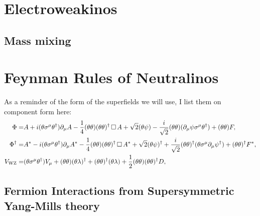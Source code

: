 \documentclass[../main.tex]{subfiles}
\begin{document}
\begin{donotread}
  \section{Electroweakinos}
  \subsection{Mass mixing}

  \section{Feynman Rules of Neutralinos}

  \begin{temporary}
    As a reminder of the form of the superfields we will use, I list them on component form here:
    \begin{subequations}
      \begin{align}
        \Phi =         & A + i(\theta\sigma^\mu\theta^\dagger) \partial_\mu A - \frac{1}{4} (\theta\theta)(\theta\theta)^\dagger \operatorname{\Box} A +
        \sqrt{2} (\theta\psi) - \frac{i}{\sqrt{2}} (\theta\theta) (\partial_\mu \psi \sigma^\mu \theta^\dagger) + (\theta\theta) F,                     \\
        \Phi^\dag =    & A^\ast - i(\theta\sigma^\mu\theta^\dagger) \partial_\mu A^\ast - \frac{1}{4} (\theta\theta)(\theta\theta)^\dagger \operatorname{\Box} A^\ast +
        \sqrt{2} (\theta\psi)^\dagger + \frac{i}{\sqrt{2}} (\theta\theta)^\dagger
        (\theta \sigma^\mu \partial_\mu \psi^\dagger) + (\theta\theta)^\dagger F^\ast,                                                                  \\
        {V}_\text{WZ} = & (\theta\sigma^\mu\theta^\dagger) V_\mu + (\theta\theta) (\theta\lambda)^\dagger +
        (\theta\theta)^\dagger(\theta\lambda) + \frac{1}{2}
        (\theta\theta)(\theta\theta)^\dagger D,
      \end{align}
    \end{subequations}
  \end{temporary}

  \subsection{Fermion Interactions from Supersymmetric Yang-Mills theory}


\end{donotread}
\end{document}
